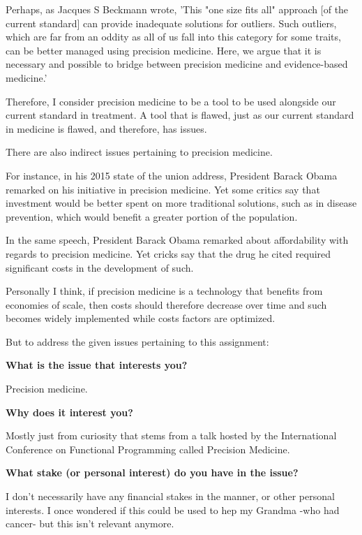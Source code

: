 Perhaps,  as Jacques S Beckmann wrote,
	’This "one size fits all" approach [of the current standard] can provide inadequate solutions for outliers. Such outliers, which are far from an oddity as all of us fall into this category for some traits, can be better managed using precision medicine. Here, we argue that it is necessary and possible to bridge between precision medicine and evidence-based medicine.’

Therefore, I consider precision medicine to be a tool to be used alongside our current standard in treatment. A tool that is flawed, just as our current standard in medicine is flawed, and therefore, has issues.

There are also indirect issues pertaining to precision medicine.

For instance, in his 2015 state of the union address, President Barack Obama remarked on his initiative in precision medicine. Yet some critics say that investment would be better spent on more traditional solutions, such as in disease prevention, which would benefit a greater portion of the population. 

In the same speech, President Barack Obama remarked about affordability with regards to precision medicine. Yet cricks say that the drug he cited required significant costs in the development of such.

Personally I think, if precision medicine is a technology that benefits from economies of scale, then costs should therefore decrease over time and such becomes widely implemented while costs factors are optimized. 


But to address the given issues pertaining to this assignment:

\newcommand{\prompt}[2]{
    \textbf{{#1}}

    \hspace{10mm} {#2}
}


\prompt{What is the issue that interests you?}{Precision medicine.}

\prompt{Why does it interest you?}{
    Mostly just from curiosity that stems  from a talk hosted by the International Conference on Functional Programming called Precision Medicine.
}

\prompt{What stake (or personal interest) do you have in the issue?}{
    I don’t necessarily have any financial stakes in the manner, or other personal interests. I once wondered if this could be used to hep my Grandma -who had cancer- but this isn’t relevant anymore.
}

